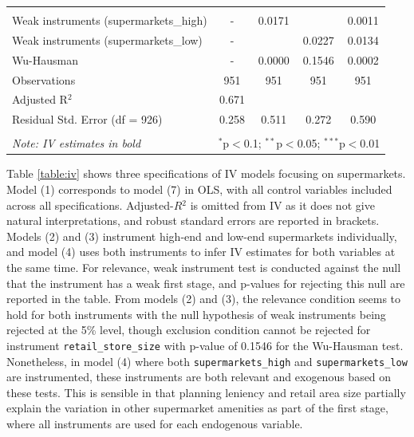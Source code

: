 \documentclass{article}
\begin{document}
\begin{table}[t]
\begin{tabular}{@{\extracolsep{5pt}}lcccc}
\hline \\[-1.8ex] 
Weak instruments (supermarkets\_high) & - & 0.0171 &  & 0.0011  \\ 
Weak instruments (supermarkets\_low) & - &  & 0.0227 & 0.0134 \\ 
Wu-Hausman & - & 0.0000 & 0.1546 & 0.0002\\ 
Observations & 951 & 951 & 951 & 951 \\ 
Adjusted R$^{2}$ & 0.671 &  &  &  \\ 
Residual Std. Error (df = 926) & 0.258 & 0.511 & 0.272 & 0.590 \\ 
\hline 
\hline \\[-1.8ex] 
\textit{Note: IV estimates in bold}  & \multicolumn{4}{r}{$^{*}$p$<$0.1; $^{**}$p$<$0.05; $^{***}$p$<$0.01} \\ 
\end{tabular} 
\end{table}

Table \ref{table:iv} shows three specifications of IV models focusing on supermarkets. Model (1) corresponds to model (7) in OLS, with all control variables included across all specifications. Adjusted-$R{^2}$ is omitted from IV as it does not give natural interpretations, and robust standard errors are reported in brackets. Models (2) and (3) instrument high-end and low-end supermarkets individually, and model (4) uses both instruments to infer IV estimates for both variables at the same time. For relevance, weak instrument test is conducted against the null that the instrument has a weak first stage, and p-values for rejecting this null are reported in the table. From models (2) and (3), the relevance condition seems to hold for both instruments with the null hypothesis of weak instruments being rejected at the 5\% level, though exclusion condition cannot be rejected for instrument \texttt{retail\_store\_size} with p-value of 0.1546 for the  Wu-Hausman test. Nonetheless, in model (4) where both \texttt{supermarkets\_high} and \texttt{supermarkets\_low} are instrumented, these instruments are both relevant and exogenous based on these tests. This is sensible in that planning leniency and retail area size partially explain the variation in other supermarket amenities as part of the first stage, where all instruments are used for each endogenous variable.
\end{document}
